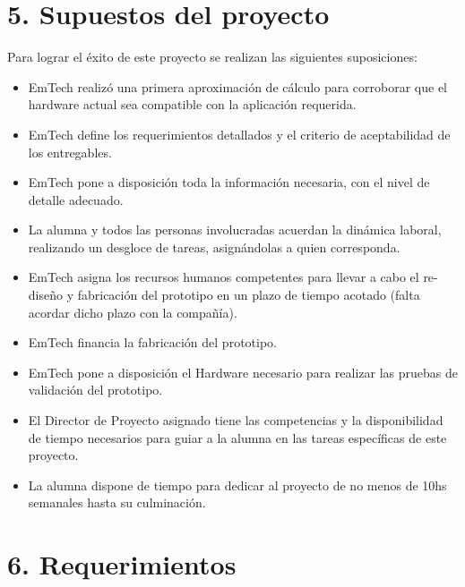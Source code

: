 \documentclass[
11pt, %
]{charter}
\begin{document}
\section{5. Supuestos del proyecto}
\label{sec:supuestos}

Para lograr el éxito de este proyecto se realizan las siguientes suposiciones:

\begin{itemize}
	\item EmTech realizó una primera aproximación de cálculo para corroborar que el hardware actual sea compatible con la aplicación requerida.
	\item EmTech define los requerimientos detallados y el criterio de aceptabilidad de los entregables.
	\item EmTech pone a disposición toda la información necesaria, con el nivel de detalle adecuado.
	\item La alumna y todos las personas involucradas acuerdan la dinámica laboral, realizando un desgloce de tareas, asignándolas a quien corresponda. 
	\item EmTech asigna los recursos humanos competentes para llevar a cabo el re-diseño y fabricación del prototipo en un plazo de tiempo acotado (falta acordar dicho plazo con la compañía).
	\item EmTech financia la fabricación del prototipo.
	\item EmTech pone a disposición el Hardware necesario para realizar las pruebas de validación del prototipo.
	\item El Director de Proyecto asignado tiene las competencias y la disponibilidad de tiempo necesarios para guiar a la alumna en las tareas específicas de este proyecto. 
	\item La alumna dispone de tiempo para dedicar al proyecto de no menos de 10hs semanales hasta su culminación.
	
\end{itemize}


\section{6. Requerimientos}
\label{sec:requerimientos}
\end{document}
